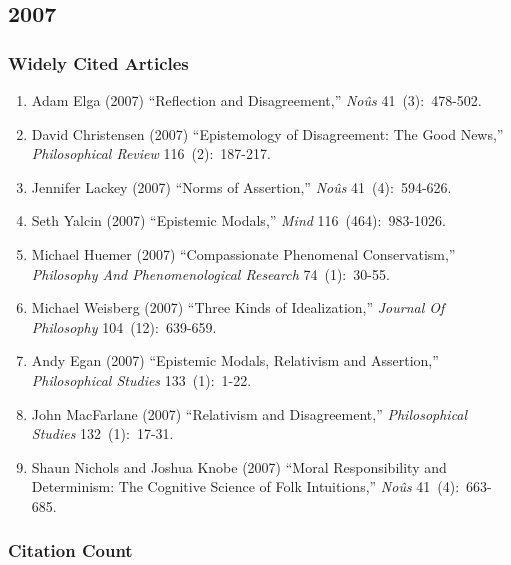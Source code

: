 \documentclass[
  10pt,
  letterpaper,
  DIV=11,
  numbers=noendperiod,
  twoside]{scrartcl}
\providecommand{\tightlist}{%
  \setlength{\itemsep}{0pt}\setlength{\parskip}{0pt}}\usepackage{longtable,booktabs,array}
\begin{document}
\newpage

\subsection{2007}\label{sec-s2007}

\subsubsection*{Widely Cited Articles}\label{widely-cited-articles-51}

\begin{enumerate}
\def\labelenumi{\arabic{enumi}.}
\tightlist
\item
  Adam Elga (2007) ``Reflection and Disagreement,'' \emph{Noûs}
  41~(3):~478-502.
\item
  David Christensen (2007) ``Epistemology of Disagreement: The Good
  News,'' \emph{Philosophical Review} 116~(2):~187-217.
\item
  Jennifer Lackey (2007) ``Norms of Assertion,'' \emph{Noûs}
  41~(4):~594-626.
\item
  Seth Yalcin (2007) ``Epistemic Modals,'' \emph{Mind}
  116~(464):~983-1026.
\item
  Michael Huemer (2007) ``Compassionate Phenomenal Conservatism,''
  \emph{Philosophy And Phenomenological Research} 74~(1):~30-55.
\item
  Michael Weisberg (2007) ``Three Kinds of Idealization,'' \emph{Journal
  Of Philosophy} 104~(12):~639-659.
\item
  Andy Egan (2007) ``Epistemic Modals, Relativism and Assertion,''
  \emph{Philosophical Studies} 133~(1):~1-22.
\item
  John MacFarlane (2007) ``Relativism and Disagreement,''
  \emph{Philosophical Studies} 132~(1):~17-31.
\item
  Shaun Nichols and Joshua Knobe (2007) ``Moral Responsibility and
  Determinism: The Cognitive Science of Folk Intuitions,'' \emph{Noûs}
  41~(4):~663-685.
\end{enumerate}

\subsubsection*{Citation Count}\label{sec-count-2007}
\end{document}
